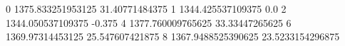 0 1375.833251953125 31.40771484375
1 1344.425537109375 0.0
2 1344.050537109375 -0.375
4 1377.760009765625 33.33447265625
6 1369.97314453125 25.547607421875
8 1367.9488525390625 23.5233154296875
